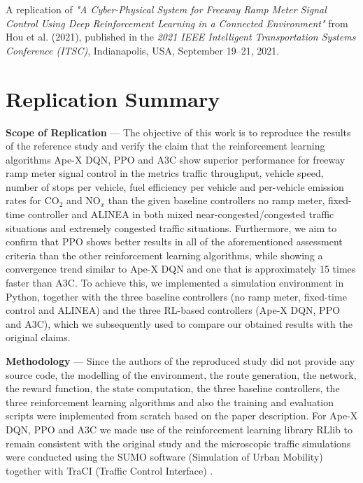 
A replication of \textit{"A Cyber-Physical System for Freeway Ramp Meter Signal Control Using Deep Reinforcement Learning in a Connected Environment"} from Hou
et al. (2021), published in the \textit{2021 IEEE Intelligent Transportation Systems Conference (ITSC)},
Indianapolis, USA, September 19--21, 2021.

\section*{Replication Summary}

\textbf{Scope of Replication} --- 
The objective of this work is to reproduce the results of the reference study \cite{hou2021rampmeter} and verify the claim that the reinforcement learning algorithms Ape-X DQN, PPO and A3C 
show superior performance for freeway ramp meter signal control in the metrics traffic throughput, vehicle speed, number of stops per vehicle, fuel efficiency per vehicle and per-vehicle emission rates for CO$_2$ and NO$_x$ 
than the given baseline controllers no ramp meter, fixed-time controller and ALINEA in both mixed near-congested/congested traffic situations and extremely congested traffic situations. 
Furthermore, we aim to confirm that PPO shows better results in all of the aforementioned assessment criteria than the other reinforcement learning algorithms, while showing a convergence trend similar to Ape-X DQN and one that is approximately 15 times faster than A3C. 
To achieve this, we implemented a simulation environment in Python, together with the three baseline controllers (no ramp meter, fixed-time control and ALINEA) and the three RL-based controllers (Ape-X DQN, PPO and A3C), which we subsequently used to compare our obtained results with the original claims. 

\vspace{1em}

\textbf{Methodology} --- 
Since the authors of the reproduced study did not provide any source code, the modelling of the environment, the route generation, the network, 
the reward function, the state computation, the three baseline controllers, the three reinforcement learning algorithms and also the training and evaluation scripts were implemented from scratch
based on the paper description. For Ape-X DQN, PPO and A3C we made use of the reinforcement learning library RLlib \cite{liang2018rllib} to remain consistent with the original study and the microscopic traffic simulations were conducted using the SUMO software (Simulation of Urban Mobility) together with TraCI (Traffic Control Interface) \cite{krajzewicz2012recent}.


